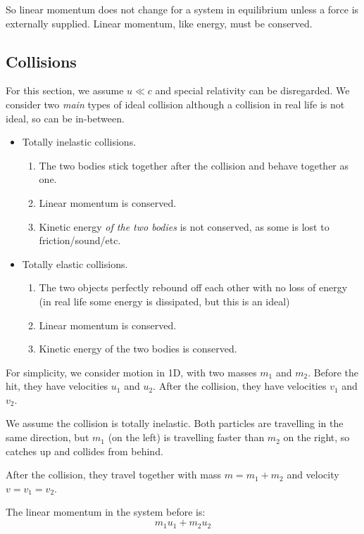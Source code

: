 So linear momentum does not change for a system in equilibrium unless a force is externally supplied. Linear momentum, like energy, must be conserved.

\subsection{Collisions}
For this section, we assume $u \ll c$ and special relativity can be disregarded. We consider two \emph{main} types of ideal collision although a collision in real life is not ideal, so can be in-between.
\begin{itemize}
    \item Totally inelastic collisions.
    \begin{enumerate}
        \item The two bodies stick together after the collision and behave together as one.
        \item Linear momentum is conserved.
        \item Kinetic energy \emph{of the two bodies} is not conserved, as some is lost to friction/sound/etc.
    \end{enumerate}
    
    \item Totally elastic collisions.
    \begin{enumerate}
        \item The two objects perfectly rebound off each other with no loss of energy (in real life some energy is dissipated, but this is an ideal)
        \item Linear momentum is conserved.
        \item Kinetic energy of the two bodies is conserved.
    \end{enumerate}
\end{itemize}

For simplicity, we consider motion in 1D, with two masses $m_1$ and $m_2$. Before the hit, they have velocities $u_1$ and $u_2$. After the collision, they have velocities $v_1$ and $v_2$.

We assume the collision is totally inelastic. Both particles are travelling in the same direction, but $m_1$ (on the left) is travelling faster than $m_2$ on the right, so catches up and collides from behind. 

After the collision, they travel together with mass $m = m_1 + m_2$ and velocity $v = v_1 = v_2$.

The linear momentum in the system before is:
\[
    m_1 u_1 + m_2 u_2
\]

